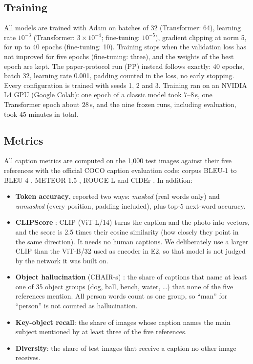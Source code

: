 \documentclass[11pt]{article}
\begin{document}
\subsection{Training}
All models are trained with Adam \cite{kingma2015} on batches of 32 (Transformer: 64), learning rate $10^{-3}$ (Transformer: $3\times10^{-4}$; fine-tuning: $10^{-5}$), gradient clipping at norm 5, for up to 40 epochs (fine-tuning: 10). Training stops when the validation loss has not improved for five epochs (fine-tuning: three), and the weights of the best epoch are kept. The paper-protocol run (PP) instead follows \cite{kavitha2025} exactly: 40 epochs, batch 32, learning rate 0.001, padding counted in the loss, no early stopping. Every configuration is trained with seeds 1, 2 and 3. Training ran on an NVIDIA L4 GPU (Google Colab): one epoch of a classic model took 7--8\,s, one Transformer epoch about 28\,s, and the nine frozen runs, including evaluation, took 45 minutes in total.

\subsection{Metrics}
All caption metrics are computed on the 1,000 test images against their five references with the official COCO caption evaluation code: corpus BLEU-1 to BLEU-4 \cite{papineni2002}, METEOR 1.5 \cite{banerjee2005}, ROUGE-L \cite{lin2004rouge} and CIDEr \cite{vedantam2015}. In addition:
\begin{itemize}
\item \textbf{Token accuracy}, reported two ways: \emph{masked} (real words only) and \emph{unmasked} (every position, padding included), plus top-5 next-word accuracy.
\item \textbf{CLIPScore} \cite{hessel2021}: CLIP (ViT-L/14) turns the caption and the photo into vectors, and the score is 2.5 times their cosine similarity (how closely they point in the same direction). It needs no human captions. We deliberately use a larger CLIP than the ViT-B/32 used as encoder in E2, so that model is not judged by the network it was built on.
\item \textbf{Object hallucination} (CHAIR-s) \cite{rohrbach2018}: the share of captions that name at least one of 35 object groups (dog, ball, bench, water, \ldots) that none of the five references mention. All person words count as one group, so ``man'' for ``person'' is not counted as hallucination.
\item \textbf{Key-object recall}: the share of images whose caption names the main subject mentioned by at least three of the five references.
\item \textbf{Diversity}: the share of test images that receive a caption no other image receives.
\end{itemize}
\end{document}
